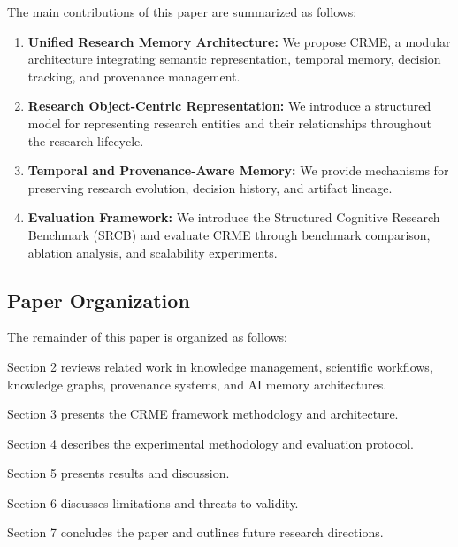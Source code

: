 The main contributions of this paper are summarized as follows:

\begin{enumerate}

\item \textbf{Unified Research Memory Architecture:}
We propose CRME, a modular architecture integrating semantic representation, temporal memory, decision tracking, and provenance management.

\item \textbf{Research Object-Centric Representation:}
We introduce a structured model for representing research entities and their relationships throughout the research lifecycle.

\item \textbf{Temporal and Provenance-Aware Memory:}
We provide mechanisms for preserving research evolution, decision history, and artifact lineage.

\item \textbf{Evaluation Framework:}
We introduce the Structured Cognitive Research Benchmark (SRCB) and evaluate CRME through benchmark comparison, ablation analysis, and scalability experiments.

\end{enumerate}


\subsection{Paper Organization}

The remainder of this paper is organized as follows:

Section 2 reviews related work in knowledge management, scientific workflows, knowledge graphs, provenance systems, and AI memory architectures.

Section 3 presents the CRME framework methodology and architecture.

Section 4 describes the experimental methodology and evaluation protocol.

Section 5 presents results and discussion.

Section 6 discusses limitations and threats to validity.

Section 7 concludes the paper and outlines future research directions.


